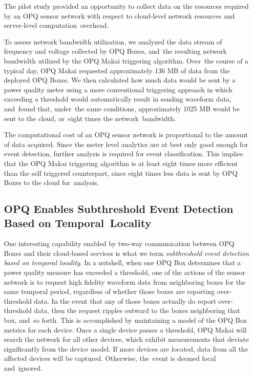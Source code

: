 \documentclass[energies,article,accept,moreauthors,pdftex]{Definitions/mdpi}
\begin{document}
The pilot study provided an opportunity to collect data on the resources required by an OPQ sensor network with respect to cloud-level network resources and server-level computation~overhead.

To assess network bandwidth utilization, we analyzed the data stream of frequency and voltage collected by OPQ Boxes, and~the resulting network bandwidth utilized by the OPQ Makai triggering algorithm. Over~the course of a typical day, OPQ Makai requested approximately 136 MB of data from the deployed OPQ Boxes. We then calculated how much data would be sent by a power quality meter using a more conventional triggering approach in which exceeding a threshold would automatically result in sending waveform data, and~found that, under~the same conditions, approximately 1025 MB would be sent to the cloud, or~eight times the network~bandwidth.

The computational cost of an OPQ sensor network is proportional to the amount of data acquired. Since the meter level analytics are at best only good enough for event detection, further analysis is required for event classification.
This implies that the OPQ Makai triggering algorithm is at least eight times more efficient than the self triggered counterpart, since eight times less data is sent by OPQ Boxes to the cloud for~analysis.

\subsection{OPQ Enables Subthreshold Event Detection Based on Temporal~Locality}
\label{sec:subthreshold-events}

One interesting capability enabled by two-way communication between OPQ Boxes and their cloud-based services is what we term {\em subthreshold event detection based on temporal locality}.
In a nutshell, when one OPQ Box determines that a power quality measure has exceeded a threshold, one of the actions of the sensor network is to request high fidelity waveform data from neighboring boxes for the same temporal period, regardless of whether those boxes are reporting over-threshold data.
In the event that any of those boxes actually do report over-threshold data, then the request ripples outward to the boxes neighboring that box, and~so forth.
This is accomplished by maintaining a model of the OPQ Box metrics for each device.
Once a single device passes a threshold, OPQ Makai will search the network for all other devices, which exhibit measurements that deviate significantly from the device model.
If more devices are located, data from all the affected devices will be captured.
Otherwise, the~event is deemed local and~ignored.
\end{document}
